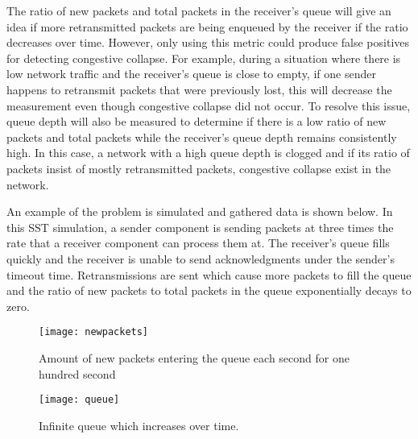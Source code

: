 \documentclass{article}
\begin{document}
The ratio of new packets and total packets in the receiver's queue will give an idea if more retransmitted packets are being enqueued by the receiver if the ratio decreases over time. However, only using this metric could produce false positives for detecting congestive collapse. For example, during a situation where there is low network traffic and the receiver's queue is close to empty, if one sender happens to retransmit packets that were previously lost, this will decrease the measurement even though congestive collapse did not occur.
To resolve this issue, queue depth will also be measured to determine if there is a low ratio of new packets and total packets while the receiver's queue depth remains consistently high. In this case, a network with a high queue depth is clogged and if its ratio of packets insist of mostly retransmitted packets, congestive collapse exist in the network.


An example of the problem is simulated and gathered data is shown below. In this SST simulation, a sender component is sending packets at three times the rate that a receiver component can process them at. The receiver's queue fills quickly and the receiver is unable to send acknowledgments under the sender's timeout time. Retransmissions are sent which cause more packets to fill the queue and the ratio of new packets to total packets in the queue exponentially decays to zero.

\begin{figure}[H]
	\texttt{[image: newpackets]}
	\centering
	\caption{Amount of new packets entering the queue each second for one hundred second}
\end{figure}

\begin{figure}[H]
	\texttt{[image: queue]}
	\centering
	\caption{Infinite queue which increases over time.}
\end{figure}
\end{document}
